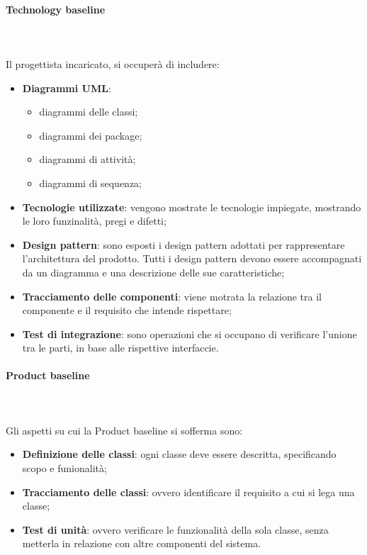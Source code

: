 			\paragraph{Technology baseline} \mbox{} \\ \mbox{} \\
			Il progettista incaricato, si occuperà di includere:
			\begin{itemize}
				\item \textbf{Diagrammi UML}:
				\begin{itemize}
					\item diagrammi delle classi;
					\item diagrammi dei package;
					\item diagrammi di attività;
					\item diagrammi di sequenza;
				\end{itemize}
				\item \textbf{Tecnologie utilizzate}: vengono mostrate le tecnologie impiegate, mostrando le loro funzinalità, pregi e difetti;
				\item \textbf{Design pattern}\glo : sono esposti i design pattern adottati per rappresentare l'architettura del prodotto. Tutti i design pattern devono essere accompagnati da un diagramma e una descrizione delle sue caratteristiche;
				\item \textbf{Tracciamento delle componenti}: viene motrata la relazione tra il componente e il requisito che intende rispettare; 
				\item \textbf{Test di integrazione}: sono operazioni che si occupano di verificare l'unione tra le parti, in base alle rispettive interfaccie.
			\end{itemize}
			\paragraph{Product baseline} \mbox{} \\ \mbox{} \\
			Gli aspetti su cui la  Product baseline si sofferma sono:
				\begin{itemize}
					\item \textbf{Definizione delle classi}: ogni classe deve essere descritta, specificando scopo e funionalità;
					\item \textbf{Tracciamento delle classi}: ovvero identificare il requisito a cui si lega una classe;
					\item \textbf{Test di unità}: ovvero verificare le funzionalità della sola classe, senza metterla in relazione con altre componenti del sistema.
				\end{itemize}
